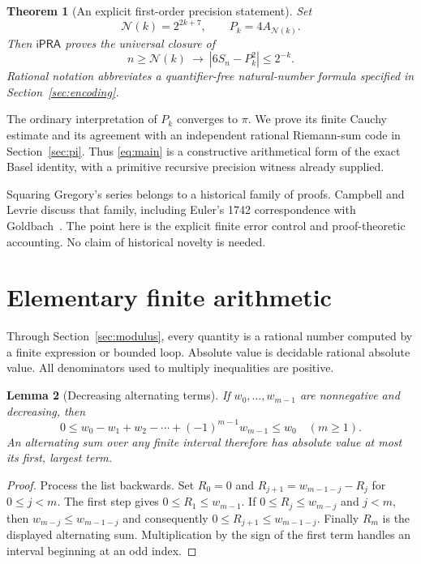 \documentclass[11pt,a4paper]{article}
\newtheorem{theorem}{Theorem}[section]
\newtheorem{lemma}[theorem]{Lemma}
\theoremstyle{remark}\newtheorem{remark}[theorem]{Remark}
\newcommand{\ipra}{\mathsf{iPRA}}
\newcommand{\abs}[1]{\left|#1\right|}
\newcommand{\cut}{\mathcal N}
\begin{document}
\begin{theorem}[An explicit first-order precision statement]\label{thm:main}
Set
\begin{equation}\label{eq:cutoff}
 \cut(k)=2^{2k+7},\qquad P_k=4A_{\cut(k)}.
\end{equation}
Then $\ipra$ proves the universal closure of
\begin{equation}\label{eq:main}
 \boxed{\displaystyle n\ge\cut(k)\ \longrightarrow\
 \abs{6S_n-P_k^2}\le2^{-k}.}
\end{equation}
Rational notation abbreviates a quantifier-free natural-number
formula specified in Section~\ref{sec:encoding}.
\end{theorem}

The ordinary interpretation of $P_k$ converges to $\pi$. We prove its
finite Cauchy estimate and its agreement with an independent rational
Riemann-sum code in Section~\ref{sec:pi}. Thus \eqref{eq:main} is a
constructive arithmetical form of the exact Basel identity, with a
primitive recursive precision witness already supplied.

Squaring Gregory's series belongs to a historical family of proofs.
Campbell and Levrie discuss that family, including Euler's 1742
correspondence with Goldbach~\cite{CampbellLevrie}. The point here is
the explicit finite error control and proof-theoretic accounting.
No claim of historical novelty is needed.

\section{Elementary finite arithmetic}\label{sec:elementary}

Through Section~\ref{sec:modulus}, every quantity is a rational number
computed by a finite expression or bounded loop. Absolute value is
decidable rational absolute value. All denominators used to multiply
inequalities are positive.

\begin{lemma}[Decreasing alternating terms]\label{lem:decreasing}
If $w_0,\ldots,w_{m-1}$ are nonnegative and decreasing, then
\[
 0\le w_0-w_1+w_2-\cdots+(-1)^{m-1}w_{m-1}\le w_0
 \quad(m\ge1).
\]
An alternating sum over any finite interval therefore has absolute
value at most its first, largest term.
\end{lemma}
\begin{proof}
Process the list backwards. Set $R_0=0$ and
$R_{j+1}=w_{m-1-j}-R_j$ for $0\le j<m$. The first step gives
$0\le R_1\le w_{m-1}$. If $0\le R_j\le w_{m-j}$ and $j<m$,
then $w_{m-j}\le w_{m-1-j}$ and consequently
$0\le R_{j+1}\le w_{m-1-j}$. Finally $R_m$ is the displayed
alternating sum. Multiplication by the sign of the first term
handles an interval beginning at an odd index.
\end{proof}
\end{document}
